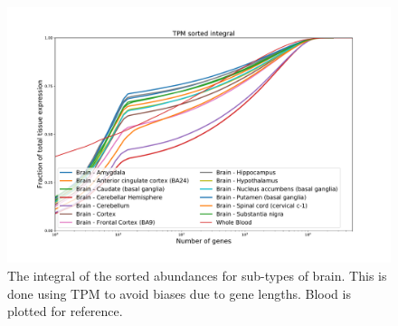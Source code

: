\begin{figure}[htb!]
  \centering
  \includegraphics[width=0.85\linewidth]{pictures/structure/gtex/fraction_of_trascriptome_Brain.pdf}
  \caption{The integral of the sorted abundances for sub-types of brain. This is done using TPM to avoid biases due to gene lengths. Blood is plotted for reference.}
  \label{fig:structure/gtex/fraction_of_trascriptome_Brain}
\end{figure}

